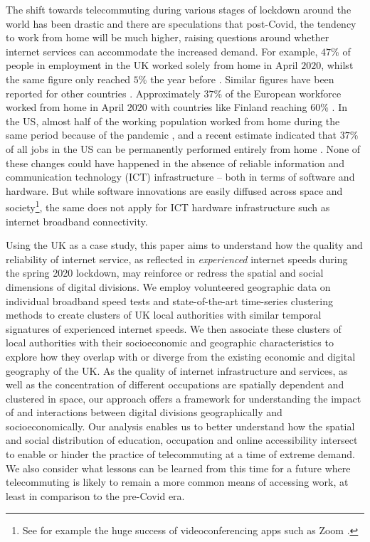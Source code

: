 \documentclass[]{interact}
\theoremstyle{plain}%
\theoremstyle{definition}
\theoremstyle{remark}
\begin{document}
The shift towards telecommuting during various stages of lockdown around
the world has been drastic and there are speculations that post-Covid,
the tendency to work from home will be much higher, raising questions
around whether internet services can accommodate the increased demand.
For example, \(47\)\% of people in employment in the UK worked solely
from home in April \(2020\), whilst the same figure only reached \(5\)\%
the year before \citep{ons2020, ons2020lm2019}. Similar figures have
been reported for other countries \citep{felstead2020homeworking}.
Approximately \(37\)\% of the European workforce worked from home in
April \(2020\) with countries like Finland reaching \(60\)\%
\citep{eurofound2020}. In the US, almost half of the working population
worked from home during the same period because of the pandemic
\citep{brynjolfsson2020covid}, and a recent estimate indicated that
\(37\)\% of all jobs in the US can be permanently performed entirely
from home \citep{NBERw26948}. None of these changes could have happened
in the absence of reliable information and communication technology
(ICT) infrastructure -- both in terms of software and hardware. But
while software innovations are easily diffused across space and
society\footnote{See for example the huge success of videoconferencing
  apps such as Zoom \citep{marks2020zoom}.}, the same does not apply for
ICT hardware infrastructure such as internet broadband connectivity.

Using the UK as a case study, this paper aims to understand how the
quality and reliability of internet service, as reflected in
\emph{experienced} internet speeds during the spring 2020 lockdown, may
reinforce or redress the spatial and social dimensions of digital
divisions. We employ volunteered geographic data on individual broadband
speed tests and state-of-the-art time-series clustering methods to
create clusters of UK local authorities with similar temporal signatures
of experienced internet speeds. We then associate these clusters of
local authorities with their socioeconomic and geographic
characteristics to explore how they overlap with or diverge from the
existing economic and digital geography of the UK. As the quality of
internet infrastructure and services, as well as the concentration of
different occupations are spatially dependent and clustered in space,
our approach offers a framework for understanding the impact of and
interactions between digital divisions geographically and
socioeconomically. Our analysis enables us to better understand how the
spatial and social distribution of education, occupation and online
accessibility intersect to enable or hinder the practice of
telecommuting at a time of extreme demand. We also consider what lessons
can be learned from this time for a future where telecommuting is likely
to remain a more common means of accessing work, at least in comparison
to the pre-Covid era.
\end{document}
